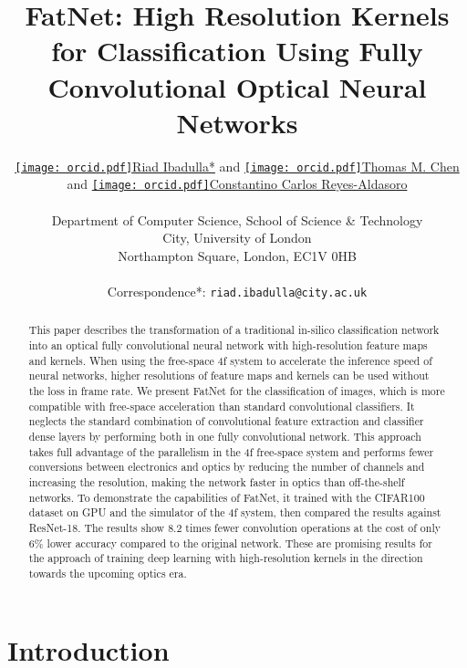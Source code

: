 \documentclass{article}
\title{FatNet: High Resolution Kernels for Classification Using Fully Convolutional Optical Neural Networks}
\author{ \href{https://orcid.org/0000-0002-0359-0830}{\texttt{[image: orcid.pdf]}\hspace{1mm}Riad Ibadulla*} and \href{https://orcid.org/0000-0001-8037-1685}{\texttt{[image: orcid.pdf]}\hspace{1mm}Thomas M. Chen} and 	\href{https://orcid.org/0000-0002-9466-2018}{\texttt{[image: orcid.pdf]}\hspace{1mm}Constantino Carlos Reyes-Aldasoro}
\\ \\
	Department of Computer Science, School of Science \& Technology\\
	City, University of London\\
	Northampton Square, London, EC1V 0HB \\ \\
	Correspondence*: \texttt{riad.ibadulla@city.ac.uk} \\
}
\begin{document}
\maketitle

\begin{abstract}
This paper describes the transformation of a traditional in-silico classification network into an optical fully convolutional neural network with high-resolution feature maps and kernels. When using the free-space 4f system to accelerate the inference speed of neural networks, higher resolutions of feature maps and kernels can be used without the loss in frame rate. We present FatNet for the classification of images, which is more compatible with free-space acceleration than standard convolutional classifiers. It neglects the standard combination of convolutional feature extraction and classifier dense layers by performing both in one fully convolutional network. This approach takes full advantage of the parallelism in the 4f free-space system and performs fewer conversions between electronics and optics by reducing the number of channels and increasing the resolution, making the network faster in optics than off-the-shelf networks. To demonstrate the capabilities of FatNet, it trained with the CIFAR100 dataset on GPU and the simulator of the 4f system, then compared the results against ResNet-18. The results show 8.2 times fewer convolution operations at the cost of only 6\% lower accuracy compared to the original network. These are promising results for the approach of training deep learning with high-resolution kernels in the direction towards the upcoming optics era.
\end{abstract}




\section{Introduction}
\end{document}
